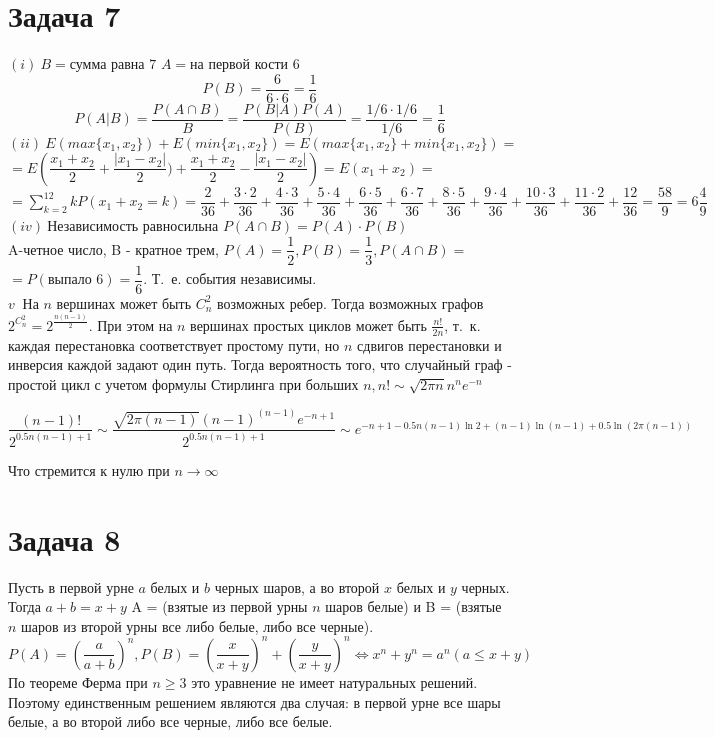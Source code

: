 \documentclass[a4paper,12pt]{article} %
\begin{document}
\section*{Задача 7}
$(i)~B = \text{сумма равна 7}$
$A = \text{на первой кости 6}$
\[P(B) = \dfrac{6}{6\cdot6}= \dfrac{1}{6}\]
\[P(A|B) = \frac{P(A\cap B)}{B} = \frac{P(B|A)P(A)}{P(B)} = \dfrac{1/6\cdot1/6}{1/6} = \dfrac{1}{6}\]
$(ii)~E(max\{x_1,x_2\})+E(min\{x_1,x_2\}) = E(max\{x_1,x_2\}  + min\{x_1,x_2\}) = $ $ = E\left(\dfrac{x_1+x_2}{2}+\dfrac{|x_1-x_2|}{2})+\dfrac{x_1+x_2}{2}-\dfrac{|x_1-x_2|}{2}\right) = E\left(x_1+x_2\right) =$ \\$=  \sum_{k=2}^{12}{kP(x_1+x_2=k)} = \dfrac{2}{36}+\dfrac{3\cdot2}{36}+\dfrac{4\cdot3}{36}+\dfrac{5\cdot4}{36}+\dfrac{6\cdot5}{36}+\dfrac{6\cdot7}{36}+\dfrac{8\cdot5}{36}+\dfrac{9\cdot4}{36}+\dfrac{10\cdot3}{36}+\dfrac{11\cdot2}{36}+\dfrac{12}{36} = \dfrac{58}{9} = 6\dfrac{4}{9} $\\

$(iv)~$Независимость равносильна $P(A\cap B) = P(A)\cdot P(B)$\\
A-четное число, B - кратное трем, $P(A)=\dfrac{1}{2}, P(B)=\dfrac{1}{3}, P(A\cap B) = $ $ = P(\text{выпало 6}) = \dfrac{1}{6}$. Т.~е. события независимы.\\

$v~$ На $n$ вершинах может быть $C_{n}^{2}$ возможных ребер. Тогда возможных графов $2^{C_{n}^{2}}= 2^{\frac{n(n-1)}{2}}$. При этом на $n$ вершинах простых циклов может быть $\frac{n!}{2n}$, т.~к. каждая перестановка соответствует простому пути, но $n$ сдвигов перестановки и инверсия каждой задают один путь. Тогда вероятность того, что случайный граф - простой цикл с учетом формулы Стирлинга при больших $n, n!\sim \sqrt{2\pi n}n^{n}e^{-n}$ 

\[\dfrac{(n-1)!}{2^{0.5n(n-1)+1}}\sim \dfrac{\sqrt{2\pi (n-1)}(n-1)^{(n-1)}e^{-n+1}}{2^{0.5n(n-1)+1}}\sim e^{-n+1-0.5n(n-1)\ln{2}+(n-1)\ln{(n-1)}+0.5\ln(2\pi(n-1))}\]

Что стремится к нулю при $n\rightarrow \infty$\\

\section*{Задача 8}

Пусть в первой урне $a$ белых и  $b$ черных шаров, а во второй $x$ белых и  $y$ черных. Тогда $a+b = x+y$
A = (взятые из первой урны $n$ шаров белые) и B = (взятые $n$ шаров из второй урны все либо белые, либо все черные).
\[P(A) = \left(\dfrac{a}{a+b}\right)^n, P(B) = \left(\dfrac{x}{x+y}\right)^n+\left(\dfrac{y}{x+y}\right)^n \Leftrightarrow x^n+y^n =a^n (a \leq x+y)\]  
По теореме Ферма при $n \geq 3$ это уравнение не имеет натуральных решений. Поэтому единственным решением являются два случая: в первой урне все шары белые, а во второй либо все черные, либо все белые.\\
\end{document}
